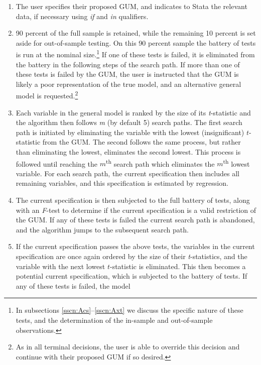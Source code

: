 \documentclass[bib]{statapress}
\begin{document}
\begin{enumerate}
 \item The user specifies their proposed GUM, and indicates to Stata the 
 relevant data, if necessary using \emph{if} and \emph{in} qualifiers.
 \item 90 percent of the full sample is retained, while the remaining 10 
 percent is set aside for out-of-sample testing.  On this 90 percent sample the
 battery of tests is run at the nominal size.\footnote{In subsections 
 \ref{sscn:Acs}--\ref{sscn:Axt} we discuss the specific nature of these tests, 
 and the determination of the in-sample and out-of-sample observations.}  If 
 one of these tests is failed, it is eliminated from the battery in the 
 following steps of the search path.  If more 
 than one of these tests is failed by the GUM, the user is instructed that 
 the GUM is likely a poor representation of the true model, and an alternative
 general model is requested.\footnote{As in all terminal decisions, the user is
 able to override this decision and continue with their proposed GUM if so 
 desired.}
 \item Each variable in the general model is ranked by the size of its 
 \emph{t}-statistic and the algorithm then follows \emph{m} (by default 5) 
 search paths.  The first search path is initiated by eliminating the variable
 with the lowest (insignificant) $t$-statistic from the GUM.  The second 
 follows the same process,
 but rather than eliminating the lowest, eliminates the second lowest.  This 
 process is followed until reaching the $m$\textsuperscript{th} search path 
 which eliminates the $m$\textsuperscript{th} lowest variable.  For each search
 path, the current specification then includes all remaining variables, and 
 this specification is estimated by regression.
 \item The current specification is then subjected to the full battery of 
 tests, along with an \emph{F}-test to determine if the current specification
 is a valid restriction of the GUM.  If any of these tests is failed the 
 current search path is abandoned, and the algorithm jumps to the subsequent 
 search path.
 \item If the current specification passes the above tests, the variables in
 the current specification are once again ordered by the size of their 
 \emph{t}-statistics, and the variable with the next lowest $t$-statistic is
 eliminated.  This then becomes a potential current specification, which is 
 subjected to the battery of tests.  If any of these tests is failed, the model

\end{enumerate}
\end{document}
